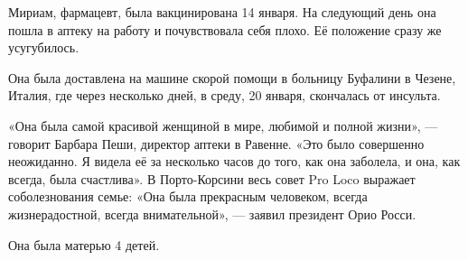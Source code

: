 Мириам, фармацевт, была вакцинирована 14 января. На следующий день она пошла в
аптеку на работу и почувствовала себя плохо. Её положение сразу же усугубилось.

Она была доставлена на машине скорой помощи в больницу Буфалини в Чезене,
Италия, где через несколько дней, в среду, 20 января, скончалась от инсульта.

«Она была самой красивой женщиной в мире, любимой и полной жизни», — говорит
Барбара Пеши, директор аптеки в Равенне. «Это было совершенно неожиданно. Я
видела её за несколько часов до того, как она заболела, и она, как всегда, была
счастлива». В Порто-Корсини весь совет Pro Loco выражает соболезнования семье:
«Она была прекрасным человеком, всегда жизнерадостной, всегда внимательной», —
заявил президент Орио Росси.

Она была матерью 4 детей.
